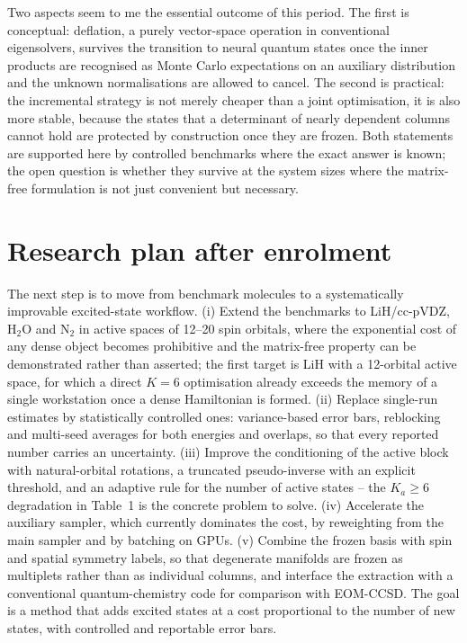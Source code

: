 \documentclass[10pt,a4paper]{article}
\begin{document}
Two aspects seem to me the essential outcome of this period. The first is conceptual: deflation, a purely vector-space operation in conventional eigensolvers, survives the transition to neural quantum states once the inner products are recognised as Monte Carlo expectations on an auxiliary distribution and the unknown normalisations are allowed to cancel. The second is practical: the incremental strategy is not merely cheaper than a joint optimisation, it is also more stable, because the states that a determinant of nearly dependent columns cannot hold are protected by construction once they are frozen. Both statements are supported here by controlled benchmarks where the exact answer is known; the open question is whether they survive at the system sizes where the matrix-free formulation is not just convenient but necessary.

\section{Research plan after enrolment}

The next step is to move from benchmark molecules to a systematically improvable excited-state workflow. (i) Extend the benchmarks to LiH/cc-pVDZ, H$_2$O and N$_2$ in active spaces of 12--20 spin orbitals, where the exponential cost of any dense object becomes prohibitive and the matrix-free property can be demonstrated rather than asserted; the first target is LiH with a 12-orbital active space, for which a direct $K=6$ optimisation already exceeds the memory of a single workstation once a dense Hamiltonian is formed. (ii) Replace single-run estimates by statistically controlled ones: variance-based error bars, reblocking and multi-seed averages for both energies and overlaps, so that every reported number carries an uncertainty. (iii) Improve the conditioning of the active block with natural-orbital rotations, a truncated pseudo-inverse with an explicit threshold, and an adaptive rule for the number of active states -- the $K_a\ge6$ degradation in Table~1 is the concrete problem to solve. (iv) Accelerate the auxiliary sampler, which currently dominates the cost, by reweighting from the main sampler and by batching on GPUs. (v) Combine the frozen basis with spin and spatial symmetry labels, so that degenerate manifolds are frozen as multiplets rather than as individual columns, and interface the extraction with a conventional quantum-chemistry code for comparison with EOM-CCSD. The goal is a method that adds excited states at a cost proportional to the number of new states, with controlled and reportable error bars.
\end{document}

